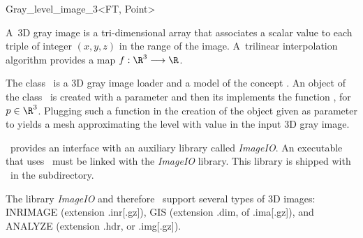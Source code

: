 

\begin{ccRefClass}{Gray_level_image_3<FT, Point>}


\ccDefinition

 A~3D gray image is a
tri-dimensional array that associates a scalar value to each triple of
integer $(x, y, z)$ in the range of the image. A~trilinear interpolation
algorithm provides a map \begin{math}f : \R^3 \longrightarrow \R\end{math}.

The class \ccRefName\ is a 3D gray image loader and a model
of the concept .
An object of the class \ccRefName\  is created with a parameter
 and then its   implements
the function , for $p \in \R^3$.
Plugging such a function in the creation of the 
object given as parameter  to  yields
a mesh approximating the level with value 
in the input 3D gray image.
 


\ccRefName\ provides an interface with an auxiliary library called
\emph{ImageIO}. An executable that uses \ccRefName\ must be linked with the \emph{ImageIO}
library. This library is shipped with \cgal\ in the
 subdirectory.

The library \emph{ImageIO} and therefore \ccRefName\ support
several types of 3D images: INRIMAGE (extension .inr[.gz]), GIS (extension
.dim, of .ima[.gz]), and ANALYZE (extension .hdr, or .img[.gz]).



\end{ccRefClass}
